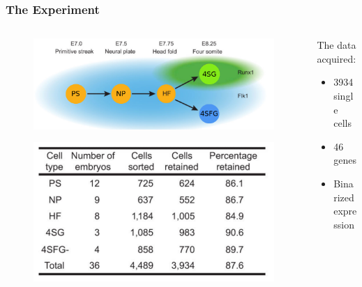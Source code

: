\documentclass[14pt,aspectratio=169]{beamer}
\begin{document}
 \begin{frame}
 	\frametitle{The Experiment}
 	\begin{columns}[T] %
 		\begin{column}{.48\textwidth}
 			\begin{figure}
 				\includegraphics*[width=  \linewidth]{./images/sampling.png}
 			\end{figure}
 			\begin{figure}
 				\includegraphics*[width=  \linewidth]{./images/numbers.png}
 			\end{figure}
 		\end{column}%
 		\hfill%
 		\begin{column}{.48\textwidth}
 			The data acquired:\\
 			\begin{itemize}
 				\item 3934 single cells
 				\item 46 genes
 				\item Binarized expression
 			\end{itemize}
 		\end{column}%
 	\end{columns}
 \end{frame}
 
\end{document}
